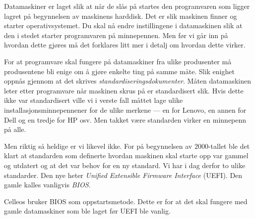 
Datamaskiner er laget slik at n\aa r de sl\aa s p\aa{} startes den programvaren som ligger lagret p\aa{} begynnelsen av maskinens harddisk. Det er slik maskinen finner og starter operativsystemet. Du skal n\aa{} endre instillingene i datamaskinen slik at den i stedet starter programvaren p\aa{} minnepennen. Men f\o r vi g\aa r inn p\aa{} hvordan dette gj\o res m\aa{} det forklares litt mer i detalj om hvordan dette virker.

For at programvare skal fungere p\aa{} datamaskiner fra ulike produsenter m\aa{} produsentene bli enige om  \aa{} gj\o re enkelte ting p\aa{} samme m\aa te. Slik enighet oppn\aa s gjennom at det skrives {\it standardiseringsdokumenter}. M\aa ten datamaskinen leter etter programvare n\aa r maskinen skrus p\aa{} er standardisert slik. Hvis dette ikke var standardisert ville vi i verste fall m\aa ttet lage ulike installasjonsminnepennener for de ulike merkene --- en for Lenovo, en annen for Dell og  en tredje for HP osv. Men takket v\ae re standarden virker en minnepenn p\aa{} alle.

Men riktig s\aa{} heldige er vi likevel ikke. For p\aa{} begynnelsen av 2000-tallet ble det klart at standarden som definerte hvordan maskinen skal starte opp var gammel og utdatert og at det var behov for en ny standard. Vi har i dag derfor to ulike standarder. Den nye heter {\it Unified Extensible Firmware Interface} (UEFI). Den gamle kalles vanligvis {\it BIOS}. 

Celleos bruker BIOS som oppstartsmetode. Dette er for at det skal fungere med gamle datamaskiner som ble laget f\o r UEFI ble vanlig. 


